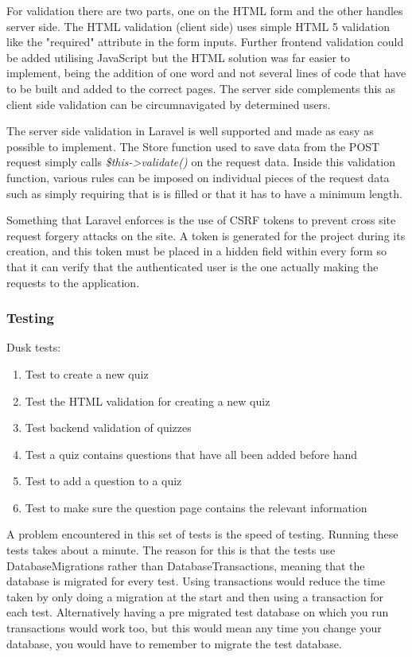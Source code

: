 For validation there are two parts, one on the HTML form and the other handles server side. The HTML validation (client side) uses simple HTML 5 validation like the "required" attribute in the form inputs. Further frontend validation could be added utilising JavaScript but the HTML solution was far easier to implement, being the addition of one word and not several lines of code that have to be built and added to the correct pages. The server side complements this as client side validation can be circumnavigated by determined users.

The server side validation in Laravel is well supported and made as easy as possible to implement. The Store function used to save data from the POST request simply calls \textit{\$this-\textgreater validate()} on the request data. Inside this validation function, various rules can be imposed on individual pieces of the request data such as simply requiring that is is filled or that it has to have a minimum length\cite{laravel-validation}.

Something that Laravel enforces is the use of CSRF tokens to prevent cross site request forgery attacks on the site. A token is generated for the project during its creation, and this token must be placed in a hidden field within every form so that it can verify that the authenticated user is the one actually making the requests to the application\cite{laravel-csrf}.
\subsubsection{Testing}
Dusk tests:
\begin{enumerate}
	\item Test to create a new quiz
	\item Test the HTML validation for creating a new quiz
	\item Test backend validation of quizzes
	\item Test a quiz contains questions that have all been added before hand
	\item Test to add a question to a quiz
	\item Test to make sure the question page contains the relevant information
\end{enumerate}
A problem encountered in this set of tests is the speed of testing. Running these tests takes about a minute. The reason for this is that the tests use DatabaseMigrations rather than DatabaseTransactions, meaning that the database is migrated for every test. Using transactions would reduce the time taken by only doing a migration at the start and then using a transaction for each test. Alternatively having a pre migrated test database on which you run transactions would work too, but this would mean any time you change your database, you would have to remember to migrate the test database. 

